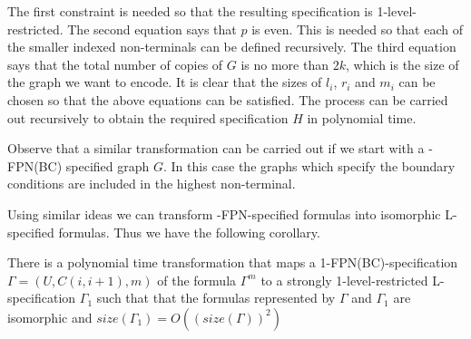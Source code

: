 The first constraint is needed so that the resulting specification is 
1-level-restricted. The second equation says that $p$ is even. This is needed 
so that each of the smaller indexed non-terminals  
can be defined recursively. 
The third equation says that the 
total number of copies of $G$ is no more than $2k$, which is the size of the
graph we want to encode. It is clear that the sizes of $l_i$, 
$r_i$ and $m_i$ can be chosen  so that the above equations can be satisfied.
The process can be
carried out recursively to obtain the required specification $H$
in polynomial time.

Observe that a similar transformation can be carried out if we start
with a {-FPN(BC)} specified graph $G$. 
In this case the graphs which specify the boundary conditions
are included in the highest non-terminal.\QED

Using similar ideas we can transform {-FPN}-specified formulas into
isomorphic {\sf L}-specified formulas. Thus we have the following corollary.


\begin{corollary}\label{cor:translate}
There is a polynomial time transformation that maps a 
1-FPN(BC)-specification $\Gamma = (U, C(i, i+1), m)$ of the formula $\Gamma^m$ 
to a strongly 1-level-restricted 
L-specification $\Gamma_1$ such that
that the formulas represented by $\Gamma$ and $\Gamma_1$ are isomorphic and
$size(\Gamma_1)= O((size(\Gamma))^2)$ 
\end{corollary}
